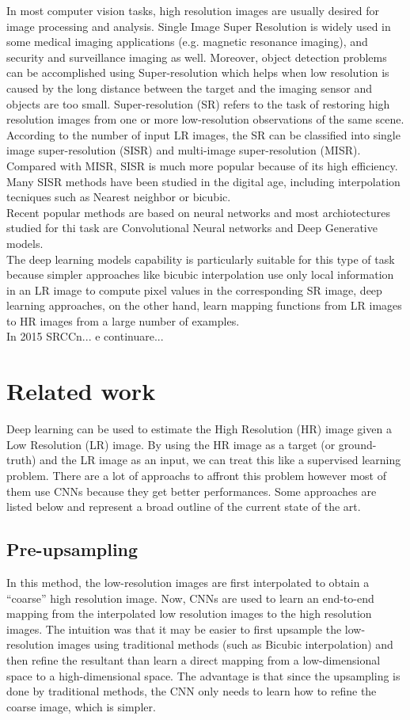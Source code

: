 \documentclass[10pt,twocolumn,letterpaper]{article}
\begin{document}
	In most computer vision tasks, high resolution images are usually desired for image processing and analysis. Single Image Super Resolution is widely used in some medical imaging applications (e.g. magnetic resonance imaging), and security and surveillance imaging as well. Moreover, object detection problems can be accomplished using Super-resolution  which helps when low resolution is caused by the long distance between the target and the imaging sensor and objects are too small.
	Super-resolution (SR) refers to the task of restoring high resolution images from one or more low-resolution observations of the same scene. According to the number of input LR images, the SR can be classified into single image super-resolution (SISR) and multi-image super-resolution (MISR). Compared with MISR, SISR is much more popular because of its high efficiency.
	Many SISR methods have been studied in the digital age, including interpolation tecniques such as Nearest neighbor or bicubic.\\
	Recent popular methods are based on neural networks and most archiotectures studied for thi task are Convolutional Neural networks and Deep Generative models.\\
	The deep learning models capability is particularly suitable for this type of task because simpler approaches like bicubic interpolation use only local information in an LR image to compute pixel values in the corresponding SR image, deep learning approaches, on the other hand, learn mapping functions from LR images to HR images from a large number of examples.\\
	In 2015 SRCCn... e continuare...
	
\section{Related work}
Deep learning can be used to estimate the High Resolution (HR) image given a Low Resolution (LR) image. By using the HR image as a target (or ground-truth) and the LR image as an input, we can treat this like a supervised learning problem. There are a lot of approachs to affront this problem however most of them use CNNs because they get better performances.  Some approaches are listed below and represent a broad outline of the current state of the art.
\subsection{Pre-upsampling}
In this method, the low-resolution images are first interpolated to obtain a “coarse” high resolution image. Now, CNNs are used to learn an end-to-end mapping from the interpolated low resolution images to the high resolution images. The intuition was that it may be easier to first upsample the low-resolution images using traditional methods (such as Bicubic interpolation) and then refine the resultant than learn a direct mapping from a low-dimensional space to a high-dimensional space. The advantage is that since the upsampling is done by traditional methods, the CNN only needs to learn how to refine the coarse image, which is simpler.
\end{document}
